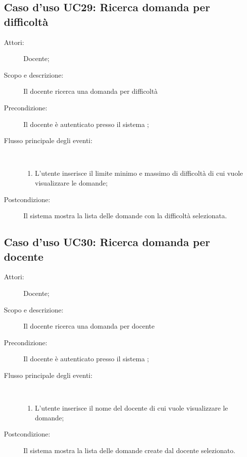 \subsection{Caso d'uso UC29: Ricerca domanda per difficoltà}\begin{description}
\item[Attori:] Docente;
\item[Scopo e descrizione:] Il docente ricerca una domanda per difficoltà

      \item[Precondizione:] Il docente è autenticato presso il sistema
;

        \item[Flusso principale degli eventi:] \ 
 \begin{enumerate}
          \item L'utente inserisce il limite minimo e massimo di difficoltà di cui vuole visualizzare le domande;

      \end{enumerate}
    \item[Postcondizione:] Il sistema mostra la lista delle domande con la difficoltà selezionata.
  \end{description}
\hypertarget{UC30}{}
\subsection{Caso d'uso UC30: Ricerca domanda per docente}\begin{description}
\item[Attori:] Docente;
\item[Scopo e descrizione:] Il docente ricerca una domanda per docente
      \item[Precondizione:] Il docente è autenticato presso il sistema
;

        \item[Flusso principale degli eventi:] \ 
 \begin{enumerate}
          \item L'utente inserisce il nome del docente di cui vuole visualizzare le domande;

      \end{enumerate}
    \item[Postcondizione:] Il sistema mostra la lista delle domande create dal docente selezionato.
  \end{description}
\hypertarget{UC31}{}
